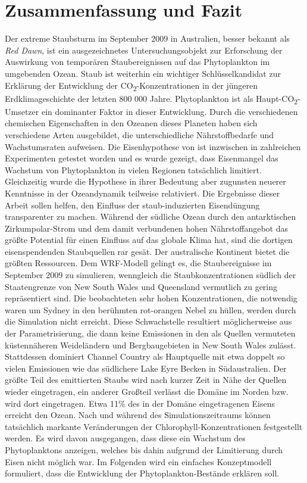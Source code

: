 \documentclass[12pt,a4paper,onecolumn]{scrartcl}
\newcommand{\cotwo}{CO\textsubscript{2}}
\begin{document}
\section{Zusammenfassung und Fazit} \label{sec:conclusion}
Der extreme Staubsturm im September 2009 in Australien, besser bekannt als \textit{Red Dawn}, ist ein ausgezeichnetes Untersuchungsobjekt zur Erforschung der Auswirkung von temporären Staubereignissen auf das Phytoplankton im umgebenden Ozean. Staub ist weiterhin ein wichtiger Schlüsselkandidat zur Erklärung der Entwicklung der \cotwo -Konzentrationen in der jüngeren Erdklimageschichte der letzten 800 000 Jahre. Phytoplankton ist als Haupt-\cotwo -Umsetzer ein dominanter Faktor in dieser Entwicklung. Durch die verschiedenen chemischen Eigenschaften in den Ozeanen dieses Planeten haben sich verschiedene Arten ausgebildet, die unterschiedliche Nährstoffbedarfe und Wachstumsraten aufweisen. Die Eisenhypothese von \citet{Martin.1990} ist inzwischen in zahlreichen Experimenten \citep{Boyd.2007} getestet worden und es wurde gezeigt, dass Eisenmangel das Wachstum von Phytoplankton in vielen Regionen tatsächlich limitiert. Gleichzeitig wurde die Hypothese in ihrer Bedeutung aber zugunsten neuerer Kenntnisse in der Ozeandynamik \citep{Tagliabue.2017} teilweise relativiert. Die Ergebnisse dieser Arbeit sollen helfen, den Einfluss der staub-induzierten Eisendüngung transparenter zu machen. Während der südliche Ozean durch den antarktischen Zirkumpolar-Strom und dem damit verbundenen hohen Nährstoffangebot das größte Potential für einen Einfluss auf das globale Klima hat, sind die dortigen eisenspendenden Staubquellen rar gesät. Der australische Kontinent bietet die größten Ressourcen. Dem WRF-Modell gelingt es, die Staubereignisse im September 2009 zu simulieren, wenngleich die Staubkonzentrationen südlich der Staatengrenze von New South Wales und Queensland vermutlich zu gering repräsentiert sind. Die beobachteten sehr hohen Konzentrationen, die notwendig waren um Sydney in den berühmten rot-orangen Nebel zu hüllen, werden durch die Simulation nicht erreicht. Diese Schwachstelle resultiert möglicherweise aus der Parametrisierung, die dann keine Emissionen in den als Quellen vermuteten \citep{Leys.2011} küstennäheren Weideländern und Bergbaugebieten in New South Wales zulässt. Stattdessen dominiert Channel Country als Hauptquelle mit etwa doppelt so vielen Emissionen wie das südlichere Lake Eyre Becken in Südaustralien. Der größte Teil des emittierten Staubs wird nach kurzer Zeit in Nähe der Quellen wieder eingetragen, ein anderer Großteil verlässt die Domäne im Norden bzw. wird dort eingetragen. Etwa 11\% des in der Domäne eingetragenen Eisens erreicht den Ozean. Nach und während des Simulationszeitraums können tatsächlich markante Veränderungen der Chlorophyll-Konzentrationen festgestellt werden. Es wird davon ausgegangen, dass diese ein Wachstum des Phytoplanktons anzeigen, welches bis dahin aufgrund der Limitierung durch Eisen nicht möglich war. Im Folgenden wird ein einfaches Konzeptmodell formuliert, dass die Entwicklung der Phytoplankton-Bestände erklären soll.
\end{document}
